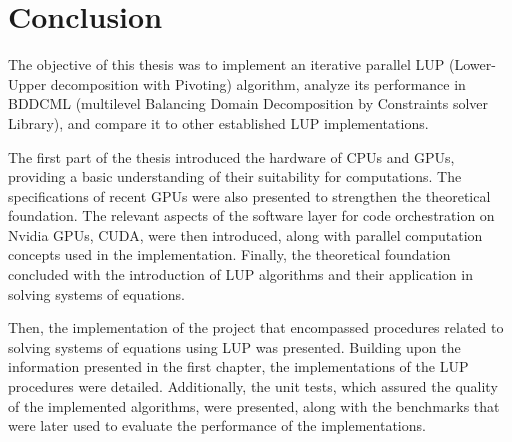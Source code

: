 \chapter*{Conclusion}				   	   %

The objective of this thesis was to implement an iterative parallel LUP (Lower-Upper decomposition with Pivoting) algorithm, analyze its performance in BDDCML (multilevel Balancing Domain Decomposition by Constraints solver Library), and compare it to other established LUP implementations.

The first part of the thesis introduced the hardware of CPUs and GPUs, providing a basic understanding of their suitability for computations.
The specifications of recent GPUs were also presented to strengthen the theoretical foundation.
The relevant aspects of the software layer for code orchestration on Nvidia GPUs, CUDA, were then introduced, along with parallel computation concepts used in the implementation.
Finally, the theoretical foundation concluded with the introduction of LUP algorithms and their application in solving systems of equations.

Then, the implementation of the project that encompassed procedures related to solving systems of equations using LUP was presented.
Building upon the information presented in the first chapter, the implementations of the LUP procedures were detailed.
Additionally, the unit tests, which assured the quality of the implemented algorithms, were presented, along with the benchmarks that were later used to evaluate the performance of the implementations.

